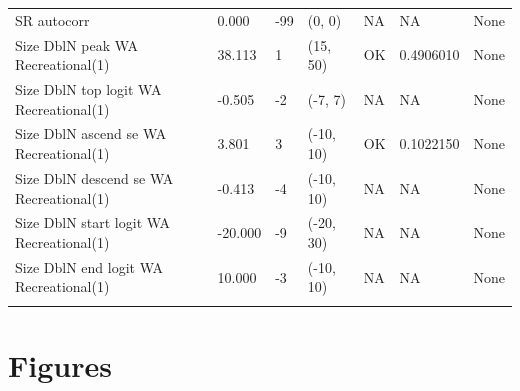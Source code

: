 \documentclass[11pt,
  english,
  a4paper,
]{article}
\begin{document}
\begin{landscape}
\begin{longtable}[t]{>{\raggedright\arraybackslash}p{6cm}lllll>{\raggedright\arraybackslash}p{4cm}}
SR autocorr & 0.000 & -99 & (0, 0) & NA & NA & None\\
Size DblN peak WA Recreational(1) & 38.113 & 1 & (15, 50) & OK & 0.4906010 & None\\
Size DblN top logit WA Recreational(1) & -0.505 & -2 & (-7, 7) & NA & NA & None\\
Size DblN ascend se WA Recreational(1) & 3.801 & 3 & (-10, 10) & OK & 0.1022150 & None\\
Size DblN descend se WA Recreational(1) & -0.413 & -4 & (-10, 10) & NA & NA & None\\
Size DblN start logit WA Recreational(1) & -20.000 & -9 & (-20, 30) & NA & NA & None\\
Size DblN end logit WA Recreational(1) & 10.000 & -3 & (-10, 10) & NA & NA & None\\*
\end{longtable}
\endgroup{}
\end{landscape}
\endgroup{}



\newpage



\newpage




\hypertarget{figures}{%
\section{Figures}\label{figures}}

\leavevmode\tagmcend\tagstructend

\end{document}
